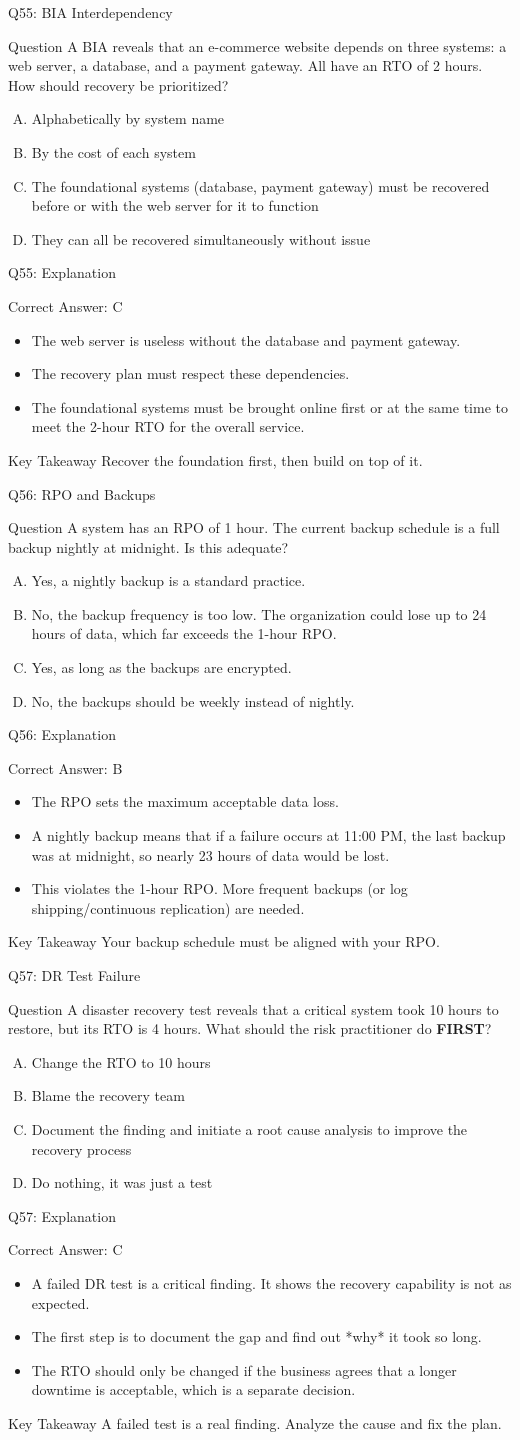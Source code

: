 \documentclass[aspectratio=169]{beamer}
\newcommand{\hq}[7]{%
	\begin{frame}{Q#1: #2}
		\begin{block}{Question}
			#3
		\end{block}
		\begin{enumerate}[(A)]
			#4
		\end{enumerate}
	\end{frame}
	\begin{frame}{Q#1: Explanation}
		\begin{block}{Correct Answer: #5}
			\begin{itemize}
				#6
			\end{itemize}
		\end{block}
		\begin{alertblock}{Key Takeaway}
			#7
		\end{alertblock}
	\end{frame}
}
\begin{document}
	\hq{55}{BIA Interdependency}
	{A BIA reveals that an e-commerce website depends on three systems: a web server, a database, and a payment gateway. All have an RTO of 2 hours. How should recovery be prioritized?}
	{\item Alphabetically by system name
		\item By the cost of each system
		\item The foundational systems (database, payment gateway) must be recovered before or with the web server for it to function
		\item They can all be recovered simultaneously without issue}
	{C}
	{\item The web server is useless without the database and payment gateway.
		\item The recovery plan must respect these dependencies.
		\item The foundational systems must be brought online first or at the same time to meet the 2-hour RTO for the overall service.}
	{Recover the foundation first, then build on top of it.}
	
	\hq{56}{RPO and Backups}
	{A system has an RPO of 1 hour. The current backup schedule is a full backup nightly at midnight. Is this adequate?}
	{\item Yes, a nightly backup is a standard practice.
		\item No, the backup frequency is too low. The organization could lose up to 24 hours of data, which far exceeds the 1-hour RPO.
		\item Yes, as long as the backups are encrypted.
		\item No, the backups should be weekly instead of nightly.}
	{B}
	{\item The RPO sets the maximum acceptable data loss.
		\item A nightly backup means that if a failure occurs at 11:00 PM, the last backup was at midnight, so nearly 23 hours of data would be lost.
		\item This violates the 1-hour RPO. More frequent backups (or log shipping/continuous replication) are needed.}
	{Your backup schedule must be aligned with your RPO.}
	
	\hq{57}{DR Test Failure}
	{A disaster recovery test reveals that a critical system took 10 hours to restore, but its RTO is 4 hours. What should the risk practitioner do \textbf{FIRST}?}
	{\item Change the RTO to 10 hours
		\item Blame the recovery team
		\item Document the finding and initiate a root cause analysis to improve the recovery process
		\item Do nothing, it was just a test}
	{C}
	{\item A failed DR test is a critical finding. It shows the recovery capability is not as expected.
		\item The first step is to document the gap and find out *why* it took so long.
		\item The RTO should only be changed if the business agrees that a longer downtime is acceptable, which is a separate decision.}
	{A failed test is a real finding. Analyze the cause and fix the plan.}
	
\end{document}
